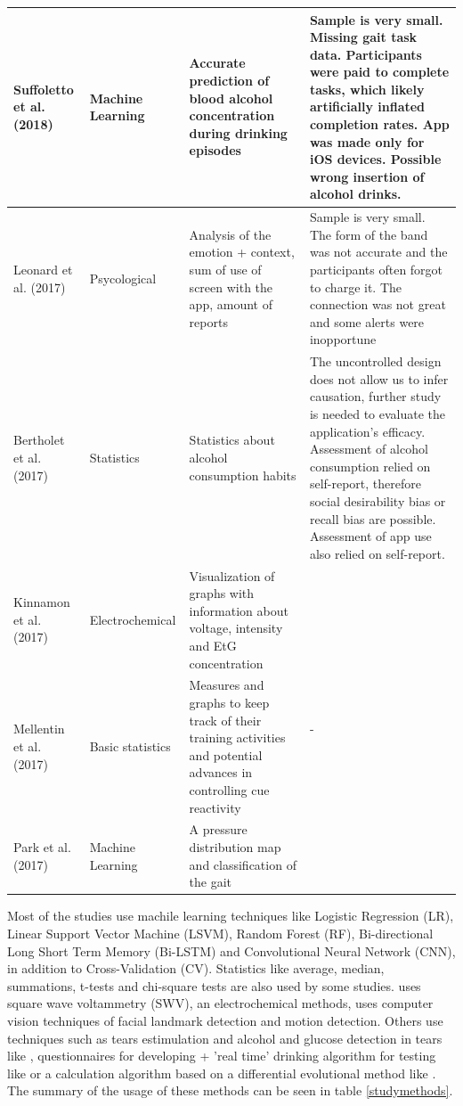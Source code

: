 \begin{longtable}{||p{} | p{} | p{} | p{}||}
Suffoletto et al. (2018) \cite{Suffoletto2018116} & Machine Learning & Accurate prediction of blood alcohol concentration during drinking episodes & Sample is very small. Missing gait task data. Participants were paid to complete tasks, which likely artificially inflated completion rates. App was made only for iOS devices. Possible wrong insertion of alcohol drinks. \\ \hline
Leonard et al. (2017) \cite{Leonard2017} & Psycological & Analysis of the emotion + context, sum of use of screen with the app, amount of reports & Sample is very small. The form of the band was not accurate and the participants often forgot to charge it. The connection was not great and some alerts were inopportune \\ \hline
Bertholet et al. (2017) \cite{Bertholet2017285} & Statistics & Statistics about alcohol consumption habits & The uncontrolled design does not allow us to infer causation, further study is needed to evaluate the application's efficacy. Assessment of alcohol consumption relied on self-report, therefore social desirability bias or recall bias are possible. Assessment of app use also relied on self-report. \\ \hline
\pagebreak
Kinnamon et al. (2017) \cite{Kinnamon2017} & Electrochemical & Visualization of graphs with information about voltage, intensity and EtG concentration & \multirow{3}{*}{-} \\ \cline{1-3}
Mellentin et al. (2017) \cite{Mellentin2017} & Basic statistics & Measures and graphs to keep track of their training activities and potential advances in controlling cue reactivity &  \\ \cline{1-3}
Park et al. (2017) \cite{Park201774} & Machine Learning & A pressure distribution map and classification of the gait &  \\ \hline
\end{longtable}

Most of the studies use machile learning techniques like Logistic Regression (LR), Linear Support Vector Machine (LSVM), Random Forest (RF), Bi-directional Long Short Term Memory (Bi-LSTM) and Convolutional Neural Network (CNN), in addition to Cross-Validation (CV).
Statistics like average, median, summations, t-tests and chi-square tests are also used by some studies.
\cite{Kinnamon2017} uses square wave voltammetry (SWV), an electrochemical methods, \cite{Chatterjee2018} uses computer vision techniques of facial landmark detection and motion detection.
Others use techniques such as tears estimulation and alcohol and glucose detection in tears like \cite{Sempionatto2019161}, questionnaires for developing + 'real time' drinking algorithm for testing like \cite{Businelle2020} or a calculation algorithm based on a differential evolutional method like \cite{Wakana2019}. The summary of the usage of these methods can be seen in table \ref{studymethods}.

